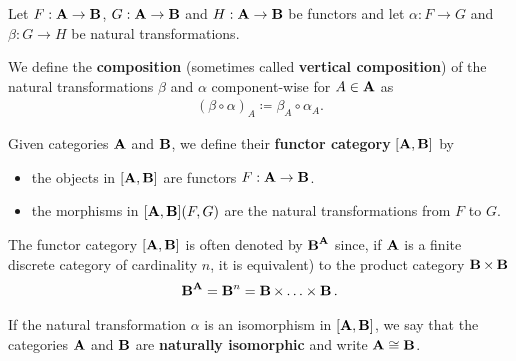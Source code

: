 \begin{definition}\label{def:natural_transformation_composition}
  Let \( F: \operatorname{\mathbf{A}} \to \operatorname{\mathbf{B}} \), \( G: \operatorname{\mathbf{A}} \to \operatorname{\mathbf{B}} \) and \( H: \operatorname{\mathbf{A}} \to \operatorname{\mathbf{B}} \) be functors and let \( \alpha: F \to G \) and \( \beta: G \to H \) be natural transformations.

  We define the \textbf{composition} (sometimes called \textbf{vertical composition}) of the natural transformations \( \beta \) and \( \alpha \) component-wise for \( A \in \operatorname{\mathbf{A}} \) as
  \begin{align*}
    (\beta \circ \alpha)_A \coloneqq \beta_{A} \circ \alpha_A.
  \end{align*}
\end{definition}

\begin{definition}\label{def:functor_category}
  Given categories \( \operatorname{\mathbf{A}} \) and \( \operatorname{\mathbf{B}} \), we define their \textbf{functor category} \( [\operatorname{\mathbf{A}}, \operatorname{\mathbf{B}}] \) by
  \begin{itemize}
    \item the objects in \( [\operatorname{\mathbf{A}}, \operatorname{\mathbf{B}}] \) are functors \( F: \operatorname{\mathbf{A}} \to \operatorname{\mathbf{B}} \).
    \item the morphisms in \( [\operatorname{\mathbf{A}}, \operatorname{\mathbf{B}}](F, G) \) are the natural transformations from \( F \) to \( G \).
  \end{itemize}

  The functor category \( [\operatorname{\mathbf{A}}, \operatorname{\mathbf{B}}] \) is often denoted by \( {\operatorname{\mathbf{B}}}^{\operatorname{\mathbf{A}}} \) since, if \( \operatorname{\mathbf{A}} \) is a finite discrete category of cardinality \( n \), it is equivalent) to the product category \( \operatorname{\mathbf{B}} \times \operatorname{\mathbf{B}} \)
  \begin{align*}
    {\operatorname{\mathbf{B}}}^{\operatorname{\mathbf{A}}} = {\operatorname{\mathbf{B}}}^n = \operatorname{\mathbf{B}} \times \ldots \times \operatorname{\mathbf{B}}.
  \end{align*}

  If the natural transformation \( \alpha \) is an isomorphism in \( [\operatorname{\mathbf{A}}, \operatorname{\mathbf{B}}] \), we say that the categories \( \operatorname{\mathbf{A}} \) and \( \operatorname{\mathbf{B}} \) are \textbf{naturally isomorphic} and write \( \operatorname{\mathbf{A}} \cong \operatorname{\mathbf{B}} \).
\end{definition}

